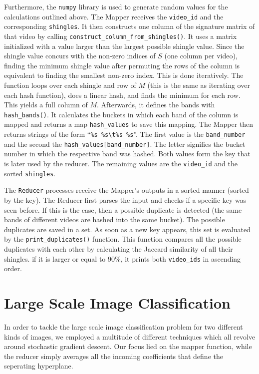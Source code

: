 \documentclass[a4paper, 11pt]{article}
\begin{document}
Furthermore, the \texttt{numpy} library is used to generate random values for the calculations outlined above. The Mapper receives the \texttt{video\_id} and the corresponding  \texttt{shingles}. It then constructs one column of the signature matrix of that video by calling \texttt{construct\_column\_from\_shingles()}. It uses a matrix initialized with a value larger than the largest possible shingle value. Since the shingle value concurs with the non-zero indices of $S$ (one column per video), finding the minimum shingle value after permuting the rows of the column is equivalent to finding the smallest non-zero index. This is done iteratively. The function loops over each shingle and row of $M$ (this is the same as iterating over each hash function), does a linear hash, and finds the minimum for each row. This yields a full column of $M$. \newline 
Afterwards, it defines the bands with \texttt{hash\_bands()}. It calculates the buckets in which each band of the column is mapped and returns a map \texttt{hash\_values} to save this mapping. The Mapper then returns  strings of the form ``\texttt{\%s \%s\textbackslash t\%s \%s}''. The first value is the \texttt{band\_number} and the second the \texttt{hash\_values[band\_number]}. The letter signifies the bucket number in which the respective band was hashed. Both values form the key that is later used by the reducer. The remaining values are the \texttt{video\_id} and the sorted \texttt{shingles}.

The \texttt{Reducer} processes receive the Mapper's outputs in a sorted manner (sorted by the key).  The Reducer first parses the input and checks if a specific key was seen before. If this is the case, then a possible duplicate is detected (the same bands of different videos are hashed into the same bucket). The possible duplicates are saved in a set. As soon as a new key appears, this set is evaluated by the \texttt{print\_duplicates()} function. This function compares all the possible duplicates with each other by calculating the Jaccard similarity of all their shingles. if it is larger or equal to 90\%, it prints both \texttt{video\_ids} in ascending order.
\newpage

\section*{Large Scale Image Classification} 

In order to tackle the large scale image classification problem for two different kinds of images, we employed a multitude of different techniques which all revolve around stochastic gradient descent. Our focus lied on the mapper function, while the reducer simply averages all the incoming coefficients that define the seperating hyperplane. 
\end{document}
